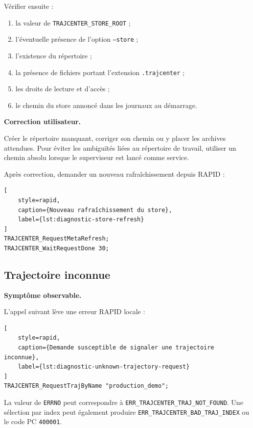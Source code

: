 \documentclass{rapportENSAM}
\begin{document}
Vérifier ensuite :

\begin{enumerate}
    \item la valeur de \texttt{TRAJCENTER\_STORE\_ROOT} ;
    \item l'éventuelle présence de l'option \texttt{--store} ;
    \item l'existence du répertoire ;
    \item la présence de fichiers portant l'extension
    \texttt{.trajcenter} ;
    \item les droits de lecture et d'accès ;
    \item le chemin du store annoncé dans les journaux au démarrage.
\end{enumerate}

\textbf{Correction utilisateur.}

Créer le répertoire manquant, corriger son chemin ou y placer les archives
attendues. Pour éviter les ambiguïtés liées au répertoire de travail, utiliser
un chemin absolu lorsque le superviseur est lancé comme service.

Après correction, demander un nouveau rafraîchissement depuis RAPID :

\begin{lstlisting}[
    style=rapid,
    caption={Nouveau rafraîchissement du store},
    label={lst:diagnostic-store-refresh}
]
TRAJCENTER_RequestMetaRefresh;
TRAJCENTER_WaitRequestDone 30;
\end{lstlisting}


\subsection{Trajectoire inconnue}
\label{subsec:diagnostic-trajectory-not-found}

\textbf{Symptôme observable.}

L'appel suivant lève une erreur RAPID locale :

\begin{lstlisting}[
    style=rapid,
    caption={Demande susceptible de signaler une trajectoire inconnue},
    label={lst:diagnostic-unknown-trajectory-request}
]
TRAJCENTER_RequestTrajByName "production_demo";
\end{lstlisting}

La valeur de \texttt{ERRNO} peut correspondre à
\texttt{ERR\_TRAJCENTER\_TRAJ\_NOT\_FOUND}. Une sélection par index peut
également produire \texttt{ERR\_TRAJCENTER\_BAD\_TRAJ\_INDEX} ou le code PC
\texttt{400001}.
\end{document}
